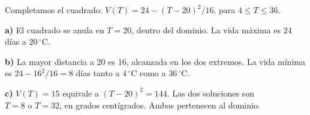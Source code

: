 Completamos el cuadrado:
$V(T)=24-(T-20)^2/16$, para $4\le T\le36$.

\textbf{a)} El cuadrado se anula en $T=20$, dentro del dominio.
La vida máxima es $\boxed{24}$ días a $20\,{}^\circ\mathrm C$.

\textbf{b)} La mayor distancia a $20$ es 16, alcanzada en
los dos extremos. La vida mínima es $24-16^2/16=\boxed{8}$ días
tanto a $4\,{}^\circ\mathrm C$ como a $36\,{}^\circ\mathrm C$.

\textbf{c)} $V(T)=15$ equivale a $(T-20)^2=144$.
Las dos soluciones son $\boxed{T=8\text{ o }T=32}$, en grados
centígrados. Ambas pertenecen al dominio.

